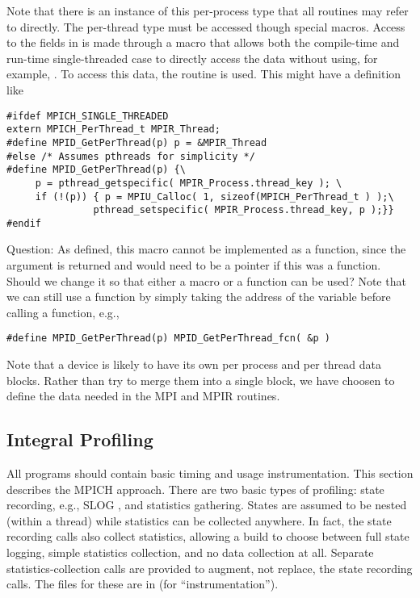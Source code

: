 \documentclass{article}
\begin{document}
Note that there is an instance of this per-process type that all routines may
refer to directly.  The per-thread type must be accessed though special
macros. 
Access to the fields in  is made through a macro that
allows both the compile-time and run-time single-threaded case to directly
access the data without using, for example, .
To access this data, the routine  is used.  This
might have a definition like
\begin{verbatim}
#ifdef MPICH_SINGLE_THREADED
extern MPICH_PerThread_t MPIR_Thread;
#define MPID_GetPerThread(p) p = &MPIR_Thread
#else /* Assumes pthreads for simplicity */
#define MPID_GetPerThread(p) {\
     p = pthread_getspecific( MPIR_Process.thread_key ); \
     if (!(p)) { p = MPIU_Calloc( 1, sizeof(MPICH_PerThread_t ) );\
               pthread_setspecific( MPIR_Process.thread_key, p );}}
#endif
\end{verbatim}
Question: As defined, this macro cannot be implemented as a function,
since the argument is returned and would need to be a pointer if this
was a function.  Should we change it so that either a macro or a
function can be used?  Note that we can still use a function by simply
taking the address of the variable before calling a function, e.g., 
\begin{verbatim}
#define MPID_GetPerThread(p) MPID_GetPerThread_fcn( &p )
\end{verbatim}

Note that a device is likely to have its own per process and per
thread data blocks.  Rather than try to merge them into a single
block, we have choosen to define the data needed in the MPI and MPIR
routines.

\subsection{Integral Profiling}
\label{sec:builtin-timing}
All programs should contain basic timing and usage instrumentation.  This
section describes the MPICH approach.
There are two basic types of profiling: state recording, e.g., SLOG
\cite{slog}, and 
statistics gathering.  States are assumed to be nested (within a
thread) while statistics can be collected anywhere.  In fact, the
state recording calls also collect statistics, allowing a build to
choose between full state logging, simple statistics collection, and
no data collection at all.  Separate statistics-collection calls are
provided to augment, not replace, the state recording calls.
The files for these are in \file{util/instrm} (for ``instrumentation'').
\end{document}
